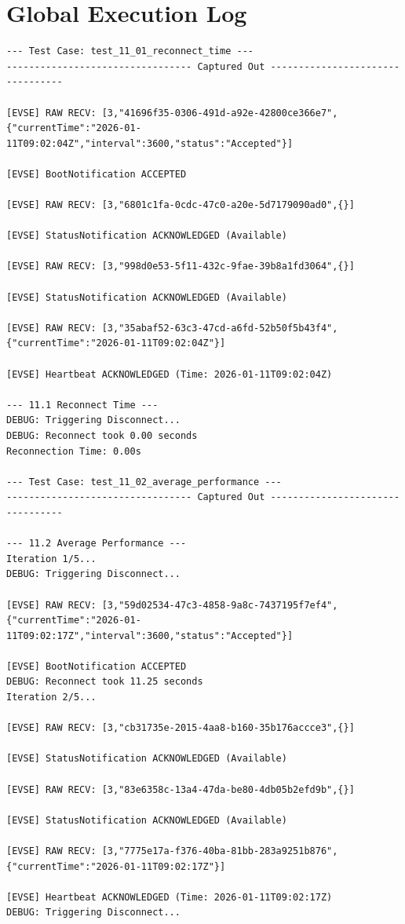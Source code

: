 \documentclass{article}
\begin{document}
\section{Global Execution Log}
\begin{lstlisting}
--- Test Case: test_11_01_reconnect_time ---
--------------------------------- Captured Out ---------------------------------

[EVSE] RAW RECV: [3,"41696f35-0306-491d-a92e-42800ce366e7",{"currentTime":"2026-01-11T09:02:04Z","interval":3600,"status":"Accepted"}]

[EVSE] BootNotification ACCEPTED

[EVSE] RAW RECV: [3,"6801c1fa-0cdc-47c0-a20e-5d7179090ad0",{}]

[EVSE] StatusNotification ACKNOWLEDGED (Available)

[EVSE] RAW RECV: [3,"998d0e53-5f11-432c-9fae-39b8a1fd3064",{}]

[EVSE] StatusNotification ACKNOWLEDGED (Available)

[EVSE] RAW RECV: [3,"35abaf52-63c3-47cd-a6fd-52b50f5b43f4",{"currentTime":"2026-01-11T09:02:04Z"}]

[EVSE] Heartbeat ACKNOWLEDGED (Time: 2026-01-11T09:02:04Z)

--- 11.1 Reconnect Time ---
DEBUG: Triggering Disconnect...
DEBUG: Reconnect took 0.00 seconds
Reconnection Time: 0.00s

--- Test Case: test_11_02_average_performance ---
--------------------------------- Captured Out ---------------------------------

--- 11.2 Average Performance ---
Iteration 1/5...
DEBUG: Triggering Disconnect...

[EVSE] RAW RECV: [3,"59d02534-47c3-4858-9a8c-7437195f7ef4",{"currentTime":"2026-01-11T09:02:17Z","interval":3600,"status":"Accepted"}]

[EVSE] BootNotification ACCEPTED
DEBUG: Reconnect took 11.25 seconds
Iteration 2/5...

[EVSE] RAW RECV: [3,"cb31735e-2015-4aa8-b160-35b176accce3",{}]

[EVSE] StatusNotification ACKNOWLEDGED (Available)

[EVSE] RAW RECV: [3,"83e6358c-13a4-47da-be80-4db05b2efd9b",{}]

[EVSE] StatusNotification ACKNOWLEDGED (Available)

[EVSE] RAW RECV: [3,"7775e17a-f376-40ba-81bb-283a9251b876",{"currentTime":"2026-01-11T09:02:17Z"}]

[EVSE] Heartbeat ACKNOWLEDGED (Time: 2026-01-11T09:02:17Z)
DEBUG: Triggering Disconnect...


\end{lstlisting}
\end{document}
